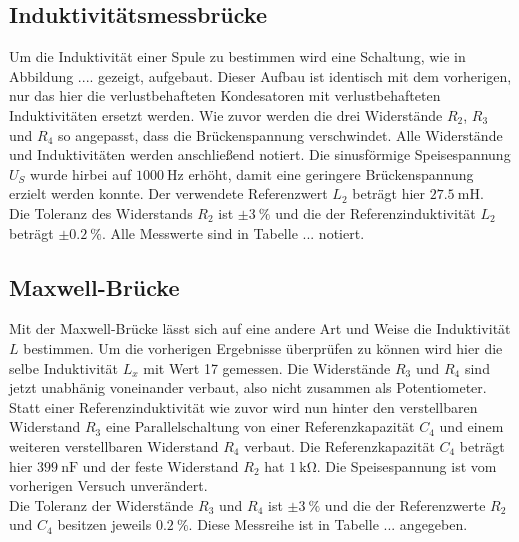\subsection{Induktivitätsmessbrücke}
\label{sec:spuleman}
Um die Induktivität einer Spule zu bestimmen wird eine Schaltung, wie in Abbildung .... gezeigt, aufgebaut. Dieser Aufbau ist identisch mit dem vorherigen, nur das hier die verlustbehafteten Kondesatoren mit verlustbehafteten Induktivitäten
ersetzt werden. Wie zuvor werden die drei Widerstände $R_{2}$, $R_{3}$ und $R_{4}$ so angepasst, dass die Brückenspannung verschwindet. Alle Widerstände und Induktivitäten werden anschließend notiert. Die sinusförmige Speisespannung $U_{S}$
wurde hirbei auf $\SI{1000}{\hertz}$ erhöht, damit eine geringere Brückenspannung erzielt werden konnte.
Der verwendete Referenzwert $L_{2}$ beträgt hier $\SI{27.5}{\milli\henry}$. 
\\
\newline
Die Toleranz des Widerstands $R_{2}$ ist $\pm\SI{3}{\percent}$ und die der Referenzinduktivität $L_{2}$ beträgt $\pm\SI{0.2}{\percent}$.
Alle Messwerte sind in Tabelle ... notiert.

\subsection{Maxwell-Brücke}
Mit der Maxwell-Brücke lässt sich auf eine andere Art und Weise die Induktivität $L$ bestimmen. Um die vorherigen Ergebnisse überprüfen zu können wird hier die selbe Induktivität $L_{x}$ mit Wert 17 gemessen. Die Widerstände $R_{3}$ und $R_{4}$ sind
jetzt unabhänig voneinander verbaut, also nicht zusammen als Potentiometer. Statt einer Referenzinduktivität wie zuvor wird nun hinter den verstellbaren Widerstand $R_{3}$ eine Parallelschaltung von einer Referenzkapazität $C_{4}$ und einem 
weiteren verstellbaren Widerstand $R_{4}$ verbaut. Die Referenzkapazität $C_{4}$ beträgt hier $\SI{399}{\nano\farad}$ und der feste Widerstand $R_{2}$ hat $\SI{1}{\kilo\ohm}$. Die Speisespannung ist vom vorherigen Versuch unverändert.
\\
\newline
Die Toleranz der Widerstände $R_{3}$ und $R_{4}$ ist $\pm\SI{3}{\percent}$ und die der Referenzwerte $R_{2}$ und $C_{4}$ besitzen jeweils $\SI{0.2}{\percent}$.
Diese Messreihe ist in Tabelle ... angegeben.

